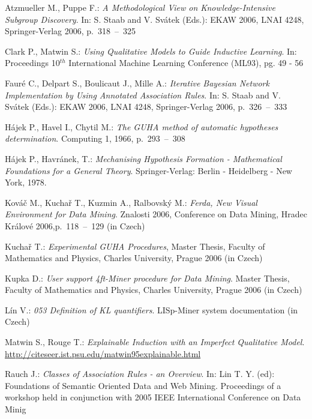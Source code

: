 \documentclass{llncs}
\begin{document}
\begin{thebibliography}{20}

Atzmueller M., Puppe F.: \emph{A Methodological View on Knowledge-Intensive Subgroup
Discovery}. In: S. Staab and V. Sv\'{a}tek (Eds.): EKAW 2006, LNAI 4248, 
Springer-Verlag 2006, p.~318~--~325


Clark P., Matwin S.: \emph{Using Qualitative Models to Guide Inductive Learning}.
In: Proceedings 10$^{th}$ International Machine Learning Conference (ML93), pg. 
49 - 56

Faur\'{e} C., Delpart S., Boulicaut J., Mille A.: \emph{Iterative Bayesian Network
Implementation by Using Annotated Association Rules}. In: S. Staab and V. Sv\'{a}tek
(Eds.): EKAW 2006, LNAI 4248, Springer-Verlag 2006, p.~326~--~333

H\'{a}jek P., Havel I., Chytil M.: \emph{The GUHA method of
automatic hypotheses determination}. Computing 1, 1966, p.~293~--~308

H\'{a}jek P., Havr\'{a}nek, T.: \emph{Mechanising Hypothesis
Formation - Mathematical  Foundations  for  a   General  Theory}.
Springer-Verlag: Berlin  - Heidelberg - New York, 1978.

Kov\'{a}\v{c} M., Kucha\v{r} T., Kuzmin A., Ralbovsk\'{y} M.: \emph{Ferda, 
New Visual Environment for Data Mining}. Znalosti 2006, 
Conference on Data Mining, Hradec Kr\'{a}lov\'{e} 2006,p.~118~--~129 (in Czech)

Kucha\v{r} T.: \emph{Experimental GUHA Procedures}, Master Thesis, 
Faculty of Mathematics and Physics, Charles University, Prague 2006 (in Czech)

Kupka D.: \emph{User support 4ft-Miner procedure for Data Mining}. Master Thesis,
Faculty of Mathematics and Physics, Charles University, Prague 2006 (in Czech)

L\'{i}n V.: \emph{053 Definition of KL quantifiers}. LISp-Miner system documentation
(in Czech)

Matwin S., Rouge T.: \emph{Explainable Induction with an Imperfect Qualitative Model}.
\url{http://citeseer.ist.psu.edu/matwin95explainable.html}

Rauch J.: \emph{Classes of Association Rules - an Overview}. In: Lin T. Y. (ed): 
Foundations of Semantic Oriented Data and Web Mining. Proceedings of a workshop
held in conjunction with 2005 IEEE International Conference on Data Minig


\end{thebibliography}
\end{document}
